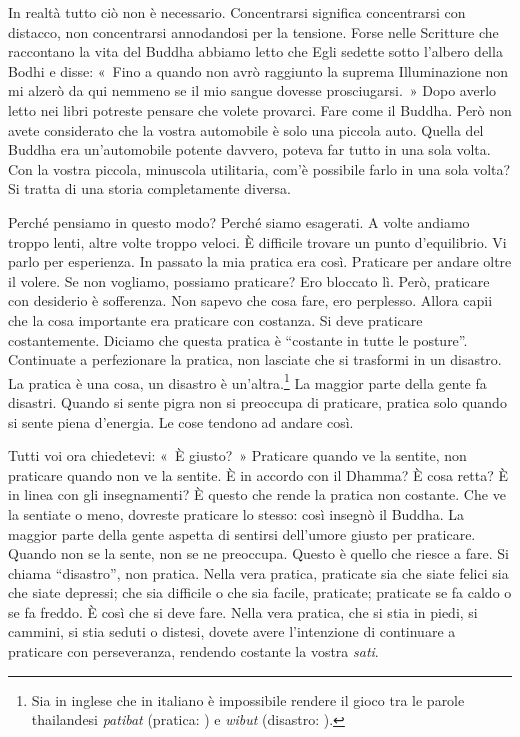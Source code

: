In realtà tutto ciò non è necessario. Concentrarsi significa
concentrarsi con distacco, non concentrarsi annodandosi per la tensione.
Forse nelle Scritture che raccontano la vita del Buddha abbiamo letto
che Egli sedette sotto l'albero della Bodhi e disse: «~Fino a quando non
avrò raggiunto la suprema Illuminazione non mi alzerò da qui nemmeno se
il mio sangue dovesse prosciugarsi.~» Dopo averlo letto nei libri
potreste pensare che volete provarci. Fare come il Buddha. Però non
avete considerato che la vostra automobile è solo una piccola auto.
Quella del Buddha era un'automobile potente davvero, poteva far tutto in
una sola volta. Con la vostra piccola, minuscola utilitaria, com'è
possibile farlo in una sola volta? Si tratta di una storia completamente
diversa.

Perché pensiamo in questo modo? Perché siamo esagerati. A volte andiamo
troppo lenti, altre volte troppo veloci. È difficile trovare un punto
d'equilibrio. Vi parlo per esperienza. In passato la mia pratica era
così. Praticare per andare oltre il volere. Se non vogliamo, possiamo
praticare? Ero bloccato lì. Però, praticare con desiderio è sofferenza.
Non sapevo che cosa fare, ero perplesso. Allora capii che la cosa
importante era praticare con costanza. Si deve praticare costantemente.
Diciamo che questa pratica è ``costante in tutte le posture''.
Continuate a perfezionare la pratica, non lasciate che si trasformi in
un disastro. La pratica è una cosa, un disastro è un'altra.\footnote{Sia
  in inglese che in italiano è impossibile rendere il gioco tra le
  parole thailandesi \emph{patibat} (pratica: ) e \emph{wibut}
  (disastro: ).} La maggior parte della gente fa disastri. Quando
si sente pigra non si preoccupa di praticare, pratica solo quando si
sente piena d'energia. Le cose tendono ad andare così.

Tutti voi ora chiedetevi: «~È giusto?~» Praticare quando ve la sentite,
non praticare quando non ve la sentite. È in accordo con il Dhamma? È
cosa retta? È in linea con gli insegnamenti? È questo che rende la
pratica non costante. Che ve la sentiate o meno, dovreste praticare lo
stesso: così insegnò il Buddha. La maggior parte della gente aspetta di
sentirsi dell'umore giusto per praticare. Quando non se la sente, non se
ne preoccupa. Questo è quello che riesce a fare. Si chiama ``disastro'',
non pratica. Nella vera pratica, praticate sia che siate felici sia che
siate depressi; che sia difficile o che sia facile, praticate; praticate
se fa caldo o se fa freddo. È così che si deve fare. Nella vera pratica,
che si stia in piedi, si cammini, si stia seduti o distesi, dovete avere
l'intenzione di continuare a praticare con perseveranza, rendendo
costante la vostra \emph{sati}.

